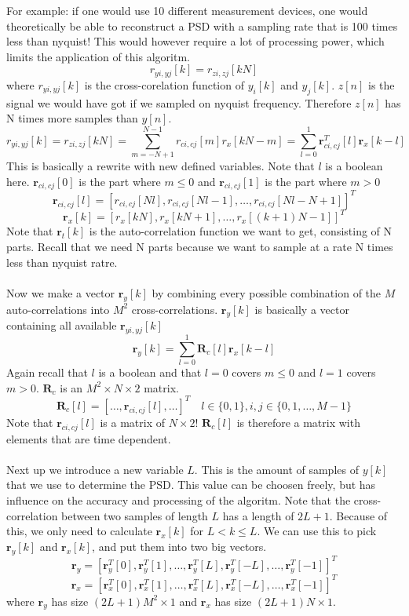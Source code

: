 \documentclass[report, oneside, a4paper, openany]{memoir}
\begin{document}
For example: if  one would use 10 different measurement devices, one would theoretically be able to reconstruct a PSD with a sampling rate that is 100 times less than nyquist! This would however require a lot of processing power, which limits the application of this algoritm.
$$
r_{yi,yj}[k] = r_{zi,zj}[kN]
$$
where $r_{yi,yj}[k]$ is the cross-corelation function of $y_i[k]$ and $y_j[k]$.
$z[n]$ is the signal we would have got if we sampled on nyquist frequency. Therefore $z[n]$ has N times more samples than $y[n]$.
$$
r_{yi,yj}[k] = r_{zi,zj}[kN] = \sum_{m=-N+1}^{N-1}r_{ci,cj}[m]r_x[kN-m] = \sum_{l=0}^1\mathbf{r}^T_{ci,cj}[l]\mathbf{r}_x[k-l]
$$
This is basically a rewrite with new defined variables. Note that $l$ is a boolean here. $\mathbf{r}_{ci,cj}[0]$ is the part where $m\leq 0$ and $\mathbf{r}_{ci,cj}[1]$ is the part where $m > 0$ 
$$
\mathbf{r}_{ci,cj}[l] = [r_{ci,cj}[Nl], r_{ci,cj}[Nl-1], \dots, r_{ci,cj}[Nl-N+1]]^T
$$
$$
\mathbf{r}_x[k]= [r_x[kN],r_x[kN+1],\dots,r_x[(k+1)N-1]]^T
$$
Note that $\mathbf{r}_t[k]$ is the auto-correlation function we want to get, consisting of N parts. Recall that we need N parts because we want to sample at a rate N times less than nyquist ratre.\\
\\
Now we make a vector $\mathbf{r}_y[k]$ by combining every possible combination of the $M$ auto-correlations into $M^2$ cross-correlations. $\mathbf{r}_y[k]$ is basically a vector containing all available $\mathbf{r}_{yi,yj}[k]$
$$
\mathbf{r}_y[k]=\sum_{l=0}^1\mathbf{R}_c[l]\mathbf{r}_x[k-l]
$$
Again recall that $l$ is a boolean and that $l=0$ covers $m\leq 0$ and $l=1$ covers $m > 0$. $\mathbf{R}_c$ is an $M^2 \times N \times 2$ matrix.
$$
\mathbf{R}_c[l] = [\dots,\mathbf{r}_{ci,cj}[l],\dots]^T \quad l \in \{0,1\}, i,j \in \{0,1, \dots, M-1\}
$$
Note that $\mathbf{r}_{ci,cj}[l]$ is a matrix of $N \times 2$! $\mathbf{R}_c[l]$ is therefore a matrix with elements that are time dependent.\\
\\
Next up we introduce a new variable $L$. This is the amount of samples of $y[k]$ that we use to determine the PSD. This value can be choosen freely, 
but has influence on the accuracy and processing of the algoritm. 
Note that the cross-correlation between two samples of length $L$ has a length of $2L+1$. Because of this, we only need to calculate $\mathbf{r}_x[k]$ for $L<k\leq L$. We can use this to pick $\mathbf{r}_y[k]$ and $\mathbf{r}_x[k]$, and put them into two big vectors.
$$
\mathbf{r}_y = [\mathbf{r}^T_y[0],\mathbf{r}^T_y[1],\dots,\mathbf{r}^T_y[L],\mathbf{r}^T_y[-L],\dots,\mathbf{r}^T_y[-1]]^T
$$
$$
\mathbf{r}_x = [\mathbf{r}^T_x[0],\mathbf{r}^T_x[1],\dots,\mathbf{r}^T_x[L],\mathbf{r}^T_x[-L],\dots,\mathbf{r}^T_x[-1]]^T
$$
where $\mathbf{r}_y$ has size $(2L+1)M^2\times 1$ and $\mathbf{r}_x$ has size $(2L+1)N \times 1$. \\
\end{document}
